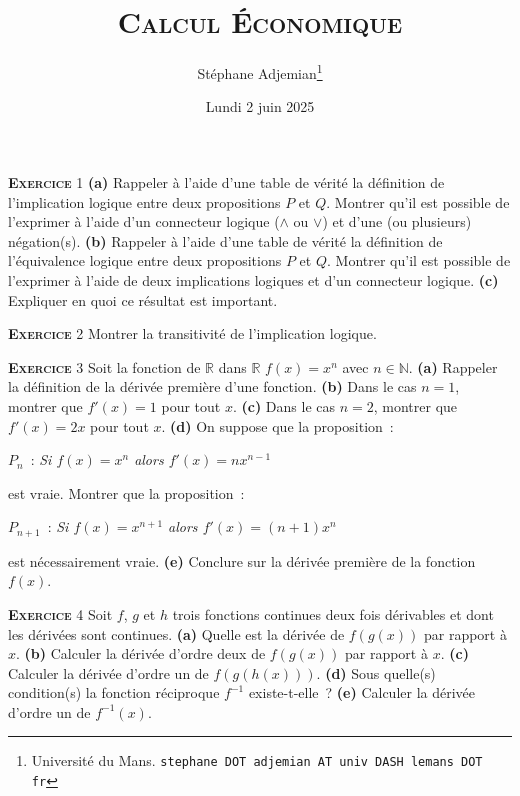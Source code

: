 \documentclass[10pt,a4paper,notitlepage,twocolumn]{article}
\newcommand{\exercise}[1]{\textsc{\textbf{Exercice}} #1}
\newcommand{\question}[1]{\textbf{(#1)}}
\begin{document}
\title{\textsc{Calcul Économique}}
\author{Stéphane Adjemian\thanks{Université du Mans. \texttt{stephane DOT adjemian AT univ DASH lemans DOT fr}}}
\date{Lundi 2 juin 2025}

\maketitle

\thispagestyle{empty}

\exercise{1} \question{a} Rappeler à l'aide d'une table de vérité la
définition de l'implication logique entre deux propositions $P$ et
$Q$. Montrer qu'il est possible de l'exprimer à l'aide d'un connecteur
logique ($\land$ ou $\lor$) et d'une (ou plusieurs)
négation(s). \question{b} Rappeler à l'aide d'une table de vérité la
définition de l'équivalence logique entre deux propositions $P$ et
$Q$. Montrer qu'il est possible de l'exprimer à l'aide de deux
implications logiques et d'un connecteur logique. \question{c} Expliquer
en quoi ce résultat est important.

\bigskip
  
\exercise{2} Montrer la transitivité de l'implication logique.

\bigskip

\exercise{3} Soit la fonction de $\mathbb R$ dans $\mathbb R$ $f(x) = x^n$ avec $n\in\mathbb N$. \question{a} Rappeler la définition de la dérivée première d'une fonction. \question{b} Dans le cas $n=1$, montrer que $f'(x) = 1$ pour tout $x$. \question{c} Dans le cas $n=2$, montrer que $f'(x) = 2x$ pour tout $x$. \question{d} On suppose que la proposition~:
\begin{center}
$P_{n}$~: \textit{Si $f(x)=x^{n}$ alors $f'(x) = n x^{n-1}$}  
\end{center}
est vraie. Montrer que la proposition~:
\begin{center}
$P_{n+1}$~: \textit{Si $f(x)=x^{n+1}$ alors $f'(x) = (n+1) x^{n}$}  
\end{center}
 est nécessairement vraie. \question{e} Conclure sur la dérivée première de la fonction $f(x)$.

\bigskip

\exercise{4} Soit $f$, $g$ et $h$ trois fonctions continues deux fois dérivables et dont les dérivées sont continues. \question{a} Quelle est la dérivée de $f(g(x))$ par rapport à $x$. \question{b} Calculer la dérivée d'ordre deux de $f(g(x))$ par rapport à $x$. \question{c} Calculer la dérivée d'ordre un de $f(g(h(x)))$. \question{d} Sous quelle(s) condition(s) la fonction réciproque $f^{-1}$ existe-t-elle~? \question{e} Calculer la dérivée d'ordre un de $f^{-1}(x)$.
\end{document}
